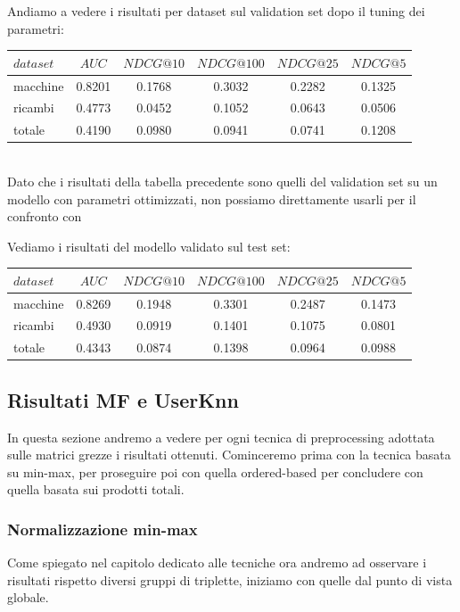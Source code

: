 Andiamo a vedere i risultati per dataset sul validation set dopo il tuning dei parametri:\\

\begin{tabular}{|l|c|cccc|}
    \toprule
    $dataset$ &    $AUC$ &  $NDCG@10$ & $NDCG@100$  & $NDCG@25$ & $NDCG@5$  \\
    \midrule
    macchine & 0.8201 & 0.1768 & 0.3032 & 0.2282 & 0.1325	 \\
    ricambi & 0.4773 & 0.0452 & 0.1052 & 0.0643 & 0.0506  \\
    totale  & 0.4190 & 0.0980 & 0.0941 & 0.0741 & 0.1208	 \\
\bottomrule
\end{tabular}\\

Dato che i risultati della tabella precedente sono quelli del validation set su un modello con parametri ottimizzati, non possiamo direttamente usarli per il confronto con 

Vediamo i risultati del modello validato sul test set:\\

\begin{tabular}{|l|c|cccc|}
    \toprule
    $dataset$ &    $AUC$ &  $NDCG@10$ & $NDCG@100$  & $NDCG@25$ & $NDCG@5$  \\
    \midrule
    macchine & 0.8269 &  0.1948 &   0.3301 &  0.2487 & 0.1473 \\
    ricambi  & 0.4930 &  0.0919 &   0.1401 &  0.1075 & 0.0801 \\
    totale  & 0.4343 &  0.0874 &   0.1398 &  0.0964 & 0.0988 \\

\bottomrule
\end{tabular}

\subsection{Risultati MF e UserKnn}
In questa sezione andremo a vedere per ogni tecnica di preprocessing adottata sulle matrici grezze i risultati ottenuti. Cominceremo prima con la tecnica basata su min-max, per proseguire poi con quella ordered-based per concludere con quella basata sui prodotti totali.

\subsubsection{Normalizzazione min-max}
Come spiegato nel capitolo dedicato alle tecniche ora andremo ad osservare i risultati rispetto diversi gruppi di triplette, iniziamo con quelle dal punto di vista globale.

